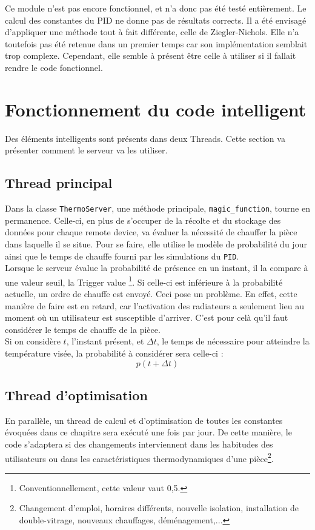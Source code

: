 \documentclass[11pt,a4paper,11pt]{report}
\begin{document}
Ce module n'est pas encore fonctionnel, et n'a donc pas été testé entièrement. Le calcul des constantes du PID ne donne pas de résultats corrects. Il a été envisagé d'appliquer une méthode tout à fait différente, celle de Ziegler-Nichols\cite{zieg}. Elle n'a toutefois pas été retenue dans un premier temps car son implémentation semblait trop complexe. Cependant, elle semble à présent être celle à utiliser si il fallait rendre le code fonctionnel.

\section{Fonctionnement du code intelligent}

Des éléments intelligents sont présents dans deux Threads. Cette section va présenter comment le serveur va les utiliser.

\subsection{Thread principal}
Dans la classe \texttt{ThermoServer}, une méthode principale, \texttt{magic\_function}, tourne en permanence. Celle-ci, en plus de s'occuper de la récolte et du stockage des données pour chaque remote device, va évaluer la nécessité de chauffer la pièce dans laquelle il se situe. Pour se faire, elle utilise le modèle de probabilité du jour ainsi que le temps de chauffe fourni par les simulations du \texttt{PID}. \\

Lorsque le serveur évalue la probabilité de présence en un instant, il la compare à une valeur seuil, la \og Trigger value \fg\footnote{Conventionnellement, cette valeur vaut 0,5.}. Si celle-ci est inférieure à la probabilité actuelle, un ordre de chauffe est envoyé. Ceci pose un problème. En effet, cette manière de faire est en retard, car l'activation des radiateurs a seulement lieu au moment où un utilisateur est susceptible d'arriver. C'est pour celà qu'il faut considérer le temps de chauffe de la pièce.\\
Si on considère $t$, l'instant présent, et $\Delta t$, le temps de nécessaire pour atteindre la température visée, la probabilité à considérer sera celle-ci : 
\begin{equation}
p(t + \Delta t)
\end{equation}

\subsection{Thread d'optimisation}
En parallèle, un thread de calcul et d'optimisation de toutes les constantes évoquées dans ce chapitre sera exécuté une fois par jour. De cette manière, le code s'adaptera si des changements interviennent dans les habitudes des utilisateurs ou dans les caractéristiques thermodynamiques d'une pièce\footnote{Changement d'emploi, horaires différents, nouvelle isolation, installation de double-vitrage, nouveaux chauffages, déménagement,...}.
\end{document}
